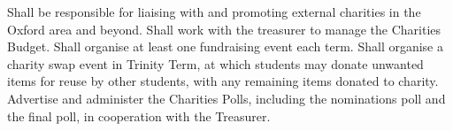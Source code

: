 Shall be responsible for liaising with and promoting external charities in the Oxford area and beyond.
Shall work with the treasurer to manage the Charities Budget.
Shall organise at least one fundraising event each term.
Shall organise a charity swap event in Trinity Term, at which students may donate unwanted items for reuse by other students, with any remaining items donated to charity.
Advertise and administer the Charities Polls, including the nominations poll and the final poll, in cooperation with the Treasurer.
